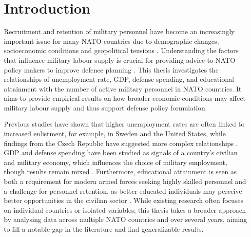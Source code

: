 \chapter{Introduction}

Recruitment and retention of military personnel have become an increasingly 
important issue for many NATO countries due to demographic changes, socioeconomic 
conditions and geopolitical tensions \parencite{nato_research_and_technology_organization_recruiting_2007,nato_nato_2022}.
Understanding the factors that influence military labour supply is crucial for providing 
advice to NATO policy makers to improve defence planning \parencite{nato_research_and_technology_organization_recruiting_2007}.
This thesis investigates the relationships of
unemployment rate, GDP, defense spending, and educational attainment with
the number of active military personnel in NATO countries.
It aims to provide empirical results on how broader economic conditions 
may affect military labour supply and thus support defense policy formulation.

Previous studies have shown that higher unemployment rates are often 
linked to increased enlistment, for example, in Sweden and the United States, 
while findings from the Czech Republic have suggested more complex relationships
\parencite{backstrom_are_2019,asch_cash_2010,holcner_military_2021}. 
GDP and defense spending have been studied as signals of a country's 
civilian and military economy, which influences the choice of military employment, 
though results remain mixed \parencite{warner_chapter_1995,holcner_military_2021}. 
Furthermore, educational attainment is seen as both a requirement for modern armed forces seeking highly skilled personnel 
and a challenge for personnel retention, as better-educated individuals may perceive better 
opportunities in the civilian sector
\parencite{cnas_resources_and_force_readiness_division_fiscal_nodate,hof_quality_2023}. 
While existing research 
often focuses on individual countries or isolated variables; this thesis takes a 
broader approach by analysing data across multiple NATO countries and over several years, 
aiming to fill a notable gap in the literature and find generalizable results.